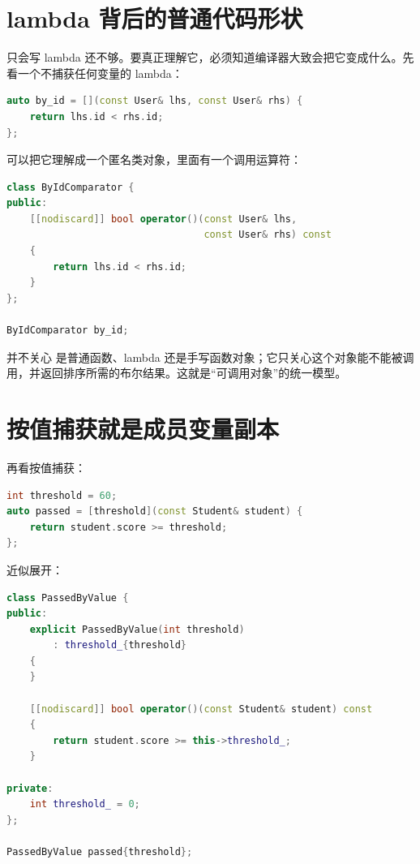 \section{lambda 背后的普通代码形状}

只会写 lambda 还不够。要真正理解它，必须知道编译器大致会把它变成什么。先看一个不捕获任何变量的 lambda：

\begin{lstlisting}[language=C++,caption={不捕获变量的 lambda}]
auto by_id = [](const User& lhs, const User& rhs) {
    return lhs.id < rhs.id;
};
\end{lstlisting}

可以把它理解成一个匿名类对象，里面有一个调用运算符：

\begin{lstlisting}[language=C++,caption={近似展开成函数对象}]
class ByIdComparator {
public:
    [[nodiscard]] bool operator()(const User& lhs,
                                  const User& rhs) const
    {
        return lhs.id < rhs.id;
    }
};

ByIdComparator by_id;
\end{lstlisting}

 并不关心  是普通函数、lambda 还是手写函数对象；它只关心这个对象能不能被调用，并返回排序所需的布尔结果。这就是“可调用对象”的统一模型。

\section{按值捕获就是成员变量副本}

再看按值捕获：

\begin{lstlisting}[language=C++,caption={按值捕获阈值}]
int threshold = 60;
auto passed = [threshold](const Student& student) {
    return student.score >= threshold;
};
\end{lstlisting}

近似展开：

\begin{lstlisting}[language=C++,caption={按值捕获展开为成员副本}]
class PassedByValue {
public:
    explicit PassedByValue(int threshold)
        : threshold_{threshold}
    {
    }

    [[nodiscard]] bool operator()(const Student& student) const
    {
        return student.score >= this->threshold_;
    }

private:
    int threshold_ = 0;
};

PassedByValue passed{threshold};
\end{lstlisting}

